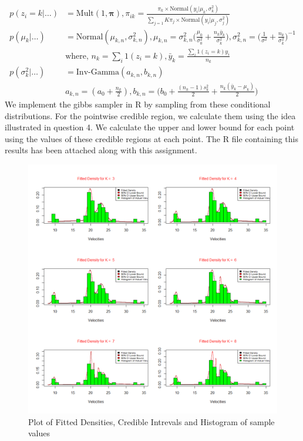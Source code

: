 \documentclass[11pt]{article}
\begin{document}
\begin{equation}
  \nonumber
  \begin{aligned}
    p(z_{i} = k | \dots) & = \text{Mult}(1, \bm{\pi}), \pi_{ik} = \frac{\pi_k \times \text{Normal}(y_i | \mu_k, \sigma_k^2)}{\sum_{j=1}{K}\pi_j \times \text{Normal}(y_i | \mu_j, \sigma_j^2)}\\
    p(\mu_k | \dots)  & = \text{Normal}(\mu_{k,n}, \sigma_{k,n}^2), \mu_{k,n} = \sigma_{k,n}^2\bigg(\frac{\mu_0}{\sigma_0^2} + \frac{n_k\bar{y}_k}{\sigma_k^2}\bigg), \sigma_{k,n}^2 = \bigg(\frac{1}{\sigma^2} + \frac{n_k}{\sigma_k^2}\bigg)^{-1}\\
    & \text{where, }n_{k} = \sum_{i}1(z_{i} = k), \bar{y}_{k} = \frac{\sum_{i}1(z_{i} = k)y_{i}}{n_k}\\
    p(\sigma_k^2 | \dots) & = \text{Inv-Gamma}(a_{k,n}, b_{k,n})\\
    & a_{k,n} = (a_0 + \frac{n_k}{2}), b_{k,n} = \bigg(b_0 + \frac{(n_k-1)s_k^2}{2} + \frac{n_k(\bar{y}_k - \mu_k)}{2}\bigg)
  \end{aligned}
\end{equation}
We implement the gibbs sampler in R by sampling from these conditional distributions. For the pointwise credible region, we calculate them using the idea illustrated in question 4. We calculate the upper and lower bound for each point using the values of these credible regions at each point. The R file containing this results has been attached along with this assignment.
\begin{figure}[H]
  \centering
  \includegraphics[width = 1\textwidth]{Fitted Densities.jpg}
  \caption{Plot of Fitted Densities, Credible Intrevals and Histogram of sample values}
\end{figure}
\end{document}
